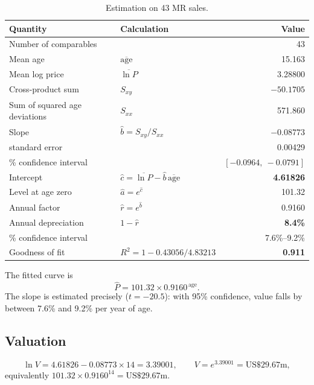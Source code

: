 \documentclass[11pt,a4paper]{article}
\newcommand{\usd}[1]{\text{US\$}#1}
\newcommand{\age}{\mathrm{age}}
\begin{document}
\begin{table}[h]
\centering
\caption{Estimation on 43 MR sales.}
\label{tab:est}
\begin{tabular}{@{}l l r@{}}
\toprule
Quantity & Calculation & Value \\
\midrule
Number of comparables & & 43 \\
Mean age & $\overline{\age}$ & 15.163 \\
Mean log price & $\overline{\ln P}$ & 3.28800 \\
Cross-product sum & $S_{xy}$ & $-50.1705$ \\
Sum of squared age deviations & $S_{xx}$ & 571.860 \\
\midrule
Slope & $\hat b = S_{xy}/S_{xx}$ & $\mathbf{-0.08773}$ \\
\quad standard error & & 0.00429 \\
\quad 95\% confidence interval & & $[-0.0964,\ -0.0791]$ \\
Intercept & $\hat c = \overline{\ln P} - \hat b\,\overline{\age}$ & \textbf{4.61826} \\
Level at age zero & $\hat a = e^{\hat c}$ & 101.32 \\
Annual factor & $\hat r = e^{\hat b}$ & 0.9160 \\
Annual depreciation & $1 - \hat r$ & \textbf{8.4\%} \\
\quad 95\% confidence interval & & 7.6\%--9.2\% \\
Goodness of fit & $R^2 = 1 - 0.43056/4.83213$ & \textbf{0.911} \\
\bottomrule
\end{tabular}
\end{table}

The fitted curve is
\[
\hat P = 101.32 \times 0.9160^{\,\age}.
\]
The slope is estimated precisely ($t = -20.5$): with 95\% confidence, value falls by between 7.6\% and 9.2\% per year of age.

\subsection{Valuation}

\[
\ln V = 4.61826 - 0.08773 \times 14 = 3.39001, \qquad V = e^{3.39001} = \usd{29.67}\text{m},
\]
equivalently $101.32 \times 0.9160^{14} = \usd{29.67}$m.
\end{document}
